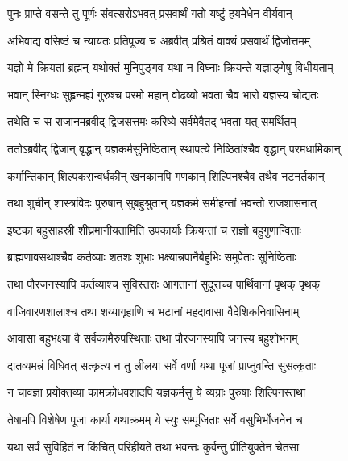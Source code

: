 
\twolineshloka
{पुनः प्राप्ते वसन्ते तु पूर्णः संवत्सरोऽभवत्}
{प्रसवार्थं गतो यष्टुं हयमेधेन वीर्यवान्} %

\twolineshloka
{अभिवाद्य वसिष्ठं च न्यायतः प्रतिपूज्य च}
{अब्रवीत् प्रश्रितं वाक्यं प्रसवार्थं द्विजोत्तमम्} %

\twolineshloka
{यज्ञो मे क्रियतां ब्रह्मन् यथोक्तं मुनिपुङ्गव}
{यथा न विघ्नाः क्रियन्ते यज्ञाङ्गेषु विधीयताम्} %

\twolineshloka
{भवान् स्निग्धः सुहृन्मह्यं गुरुश्च परमो महान्}
{वोढव्यो भवता चैव भारो यज्ञस्य चोद्यतः} %

\twolineshloka
{तथेति च स राजानमब्रवीद् द्विजसत्तमः}
{करिष्ये सर्वमेवैतद् भवता यत् समर्थितम्} %

\twolineshloka
{ततोऽब्रवीद् द्विजान् वृद्धान् यज्ञकर्मसुनिष्ठितान्}
{स्थापत्ये निष्ठितांश्चैव वृद्धान् परमधार्मिकान्} %

\twolineshloka
{कर्मान्तिकान् शिल्पकरान्वर्धकीन् खनकानपि}
{गणकान् शिल्पिनश्चैव तथैव नटनर्तकान्} %

\twolineshloka
{तथा शुचीन् शास्त्रविदः पुरुषान् सुबहुश्रुतान्}
{यज्ञकर्म समीहन्तां भवन्तो राजशासनात्} %

\twolineshloka
{इष्टका बहुसाहस्री शीघ्रमानीयतामिति}
{उपकार्याः क्रियन्तां च राज्ञो बहुगुणान्विताः} %

\twolineshloka
{ब्राह्मणावसथाश्चैव कर्तव्याः शतशः शुभाः}
{भक्ष्यान्नपानैर्बहुभिः समुपेताः सुनिष्ठिताः} %

\twolineshloka
{तथा पौरजनस्यापि कर्तव्याश्च सुविस्तराः}
{आगतानां सुदूराच्च पार्थिवानां पृथक् पृथक्} %

\twolineshloka
{वाजिवारणशालाश्च तथा शय्यागृहाणि च}
{भटानां महदावासा वैदेशिकनिवासिनाम्} %

\twolineshloka
{आवासा बहुभक्ष्या वै सर्वकामैरुपस्थिताः}
{तथा पौरजनस्यापि जनस्य बहुशोभनम्} %

\twolineshloka
{दातव्यमन्नं विधिवत् सत्कृत्य न तु लीलया}
{सर्वे वर्णा यथा पूजां प्राप्नुवन्ति सुसत्कृताः} %

\twolineshloka
{न चावज्ञा प्रयोक्तव्या कामक्रोधवशादपि}
{यज्ञकर्मसु ये व्यग्राः पुरुषाः शिल्पिनस्तथा} %

\twolineshloka
{तेषामपि विशेषेण पूजा कार्या यथाक्रमम्}
{ये स्युः सम्पूजिताः सर्वे वसुभिर्भोजनेन च} %

\twolineshloka
{यथा सर्वं सुविहितं न किंचित् परिहीयते}
{तथा भवन्तः कुर्वन्तु प्रीतियुक्तेन चेतसा} %

